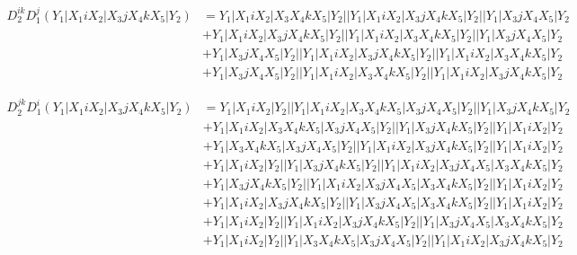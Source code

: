 \documentclass{article}[12pt]
\begin{document}
\begin{align*}
D_2^{ik}D_1^j(Y_1|X_1iX_2|X_3jX_4kX_5|Y_2)& =Y_1|X_1iX_2|X_3X_4kX_5|Y_2||Y_1|X_1iX_2|X_3jX_4kX_5|Y_2||Y_1|X_3jX_4X_5|Y_2\\ 
 & +Y_1|X_1iX_2|X_3jX_4kX_5|Y_2||Y_1|X_1iX_2|X_3X_4kX_5|Y_2||Y_1|X_3jX_4X_5|Y_2\\ 
 & +Y_1|X_3jX_4X_5|Y_2||Y_1|X_1iX_2|X_3jX_4kX_5|Y_2||Y_1|X_1iX_2|X_3X_4kX_5|Y_2\\ 
 & +Y_1|X_3jX_4X_5|Y_2||Y_1|X_1iX_2|X_3X_4kX_5|Y_2||Y_1|X_1iX_2|X_3jX_4kX_5|Y_2\end{align*}

\begin{align*}
D_2^{jk}D_1^i(Y_1|X_1iX_2|X_3jX_4kX_5|Y_2)& =Y_1|X_1iX_2|Y_2||Y_1|X_1iX_2|X_3X_4kX_5|X_3jX_4X_5|Y_2||Y_1|X_3jX_4kX_5|Y_2\\ 
 & +Y_1|X_1iX_2|X_3X_4kX_5|X_3jX_4X_5|Y_2||Y_1|X_3jX_4kX_5|Y_2||Y_1|X_1iX_2|Y_2\\ 
 & +Y_1|X_3X_4kX_5|X_3jX_4X_5|Y_2||Y_1|X_1iX_2|X_3jX_4kX_5|Y_2||Y_1|X_1iX_2|Y_2\\ 
 & +Y_1|X_1iX_2|Y_2||Y_1|X_3jX_4kX_5|Y_2||Y_1|X_1iX_2|X_3jX_4X_5|X_3X_4kX_5|Y_2\\ 
 & +Y_1|X_3jX_4kX_5|Y_2||Y_1|X_1iX_2|X_3jX_4X_5|X_3X_4kX_5|Y_2||Y_1|X_1iX_2|Y_2\\ 
 & +Y_1|X_1iX_2|X_3jX_4kX_5|Y_2||Y_1|X_3jX_4X_5|X_3X_4kX_5|Y_2||Y_1|X_1iX_2|Y_2\\ 
 & +Y_1|X_1iX_2|Y_2||Y_1|X_1iX_2|X_3jX_4kX_5|Y_2||Y_1|X_3jX_4X_5|X_3X_4kX_5|Y_2\\ 
 & +Y_1|X_1iX_2|Y_2||Y_1|X_3X_4kX_5|X_3jX_4X_5|Y_2||Y_1|X_1iX_2|X_3jX_4kX_5|Y_2\end{align*}
\end{document}
